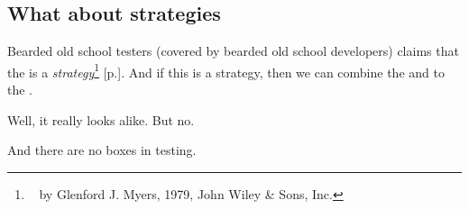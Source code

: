 \subsection{What about strategies}

Bearded old school testers (covered by bearded old school developers) claims that the  is a \emph{strategy}\footnote{~ by Glenford J. Myers, 1979, John Wiley \& Sons, Inc.} [p.\pageref{sec:Strategy}]. And if this is a strategy, then we can combine the  and  to the .

Well, it really looks alike. But no.

And there are no  boxes in testing.
